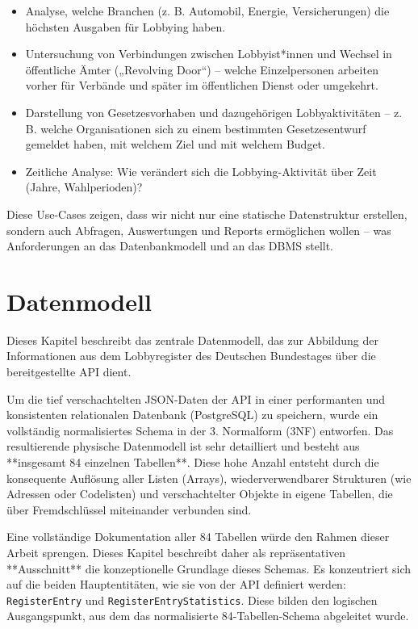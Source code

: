 \documentclass[12pt,twoside=false,a4paper,parskip]{scrbook}
\begin{document}
\begin{itemize}
\item Analyse, welche Branchen (z. B. Automobil, Energie, Versicherungen) die höchsten Ausgaben für Lobbying haben.
\item Untersuchung von Verbindungen zwischen Lobbyist*innen und Wechsel in öffentliche Ämter („Revolving Door“) – welche Einzelpersonen arbeiten vorher für Verbände und später im öffentlichen Dienst oder umgekehrt.
\item Darstellung von Gesetzesvorhaben und dazugehörigen Lobbyaktivitäten – z. B. welche Organisationen sich zu einem bestimmten Gesetzesentwurf gemeldet haben, mit welchem Ziel und mit welchem Budget.
\item Zeitliche Analyse: Wie verändert sich die Lobbying-Aktivität über Zeit (Jahre, Wahlperioden)?
\end{itemize}

Diese Use-Cases zeigen, dass wir nicht nur eine statische Datenstruktur erstellen, sondern auch Abfragen, Auswertungen und Reports ermöglichen wollen – was Anforderungen an das Datenbankmodell und an das DBMS stellt.

\chapter{Datenmodell}
\label{ch:datamodell}

Dieses Kapitel beschreibt das zentrale Datenmodell, das zur Abbildung der Informationen aus dem Lobbyregister des Deutschen Bundestages über die bereitgestellte API dient.

Um die tief verschachtelten JSON-Daten der API in einer performanten und konsistenten relationalen Datenbank (PostgreSQL) zu speichern, wurde ein vollständig normalisiertes Schema in der 3. Normalform (3NF) entworfen. Das resultierende physische Datenmodell ist sehr detailliert und besteht aus **insgesamt 84 einzelnen Tabellen**. Diese hohe Anzahl entsteht durch die konsequente Auflösung aller Listen (Arrays), wiederverwendbarer Strukturen (wie Adressen oder Codelisten) und verschachtelter Objekte in eigene Tabellen, die über Fremdschlüssel miteinander verbunden sind.

Eine vollständige Dokumentation aller 84 Tabellen würde den Rahmen dieser Arbeit sprengen. Dieses Kapitel beschreibt daher als repräsentativen **Ausschnitt** die konzeptionelle Grundlage dieses Schemas. Es konzentriert sich auf die beiden Hauptentitäten, wie sie von der API definiert werden: \texttt{RegisterEntry} und \texttt{RegisterEntryStatistics}. Diese bilden den logischen Ausgangspunkt, aus dem das normalisierte 84-Tabellen-Schema abgeleitet wurde.
\end{document}
